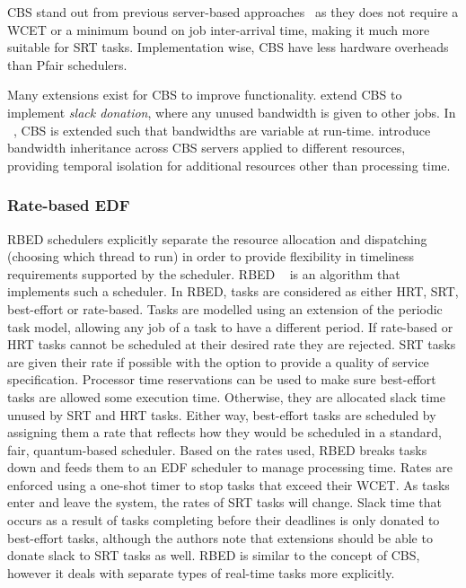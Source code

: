 \gls{CBS} stand out from previous server-based approaches~\citep{Spuri_Buttazzo_96,
Ghazalie_Baker_95, Spuri_Buttazzo_94, Deng_Liu_97} as they does not require a \gls{WCET} or a minimum
bound on job inter-arrival time, making it much more suitable for \gls{SRT} tasks.  Implementation
wise, \gls{CBS} have less hardware overheads than Pfair schedulers.

Many extensions exist for \gls{CBS} to improve functionality.  \citet{Kato_IR_11} extend \gls{CBS} to
implement \emph{slack donation}, where any unused bandwidth is given to other jobs.  In
~\citep{Craciunas_KPRS_12}, \gls{CBS} is extended such that bandwidths are variable at run-time.
\citet{Lamastra_LA_01} introduce bandwidth inheritance across CBS servers applied to different
resources, providing temporal isolation for additional resources other than processing time.

\subsubsection{Rate-based EDF}

\Gls{RBED} schedulers explicitly separate the resource allocation and dispatching
(choosing which thread to run) in order to provide flexibility in timeliness requirements supported
by the scheduler.  \Gls{RBED} ~\citep{Brandt_BLB_03} is an algorithm that implements such a
scheduler.  In \gls{RBED}, tasks are considered as either \gls{HRT}, \gls{SRT}, best-effort or
rate-based.  Tasks are modelled using an extension of the periodic task model, allowing any job of a
task to have a different period.  If rate-based or \gls{HRT} tasks cannot be scheduled at their
desired rate they are rejected.  \gls{SRT} tasks are given their rate if possible with the option to
provide a quality of service specification.  Processor time reservations can be used to make sure
best-effort tasks are allowed some execution time.  Otherwise, they are allocated slack time unused
by SRT and HRT tasks.  Either way, best-effort tasks are scheduled by assigning them a rate that
reflects how they would be scheduled in a standard, fair, quantum-based scheduler.  Based on the
rates used, \gls{RBED} breaks tasks down and feeds them to an \gls{EDF} scheduler to manage
processing time.  Rates are enforced using a one-shot timer to stop tasks that exceed their
{\gls{WCET}}.  As tasks enter and leave the system, the rates of \gls{SRT} tasks will change.  Slack
time that occurs as a result of tasks completing before their deadlines is only donated to 
best-effort tasks, although the authors note that extensions should be able to donate slack to \gls{SRT}
tasks as well.  \Gls{RBED} is similar to the concept of \gls{CBS}, however it deals with separate types of
real-time tasks more explicitly.


